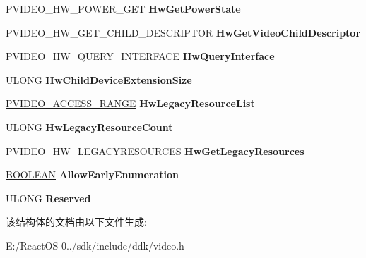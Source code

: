 \begin{DoxyCompactItemize}
P\+V\+I\+D\+E\+O\+\_\+\+H\+W\+\_\+\+P\+O\+W\+E\+R\+\_\+\+G\+ET {\bfseries Hw\+Get\+Power\+State}
\item 
\mbox{\label{struct___v_i_d_e_o___h_w___i_n_i_t_i_a_l_i_z_a_t_i_o_n___d_a_t_a_a9a52666084cdb59af0001df56b88f97a}} 
P\+V\+I\+D\+E\+O\+\_\+\+H\+W\+\_\+\+G\+E\+T\+\_\+\+C\+H\+I\+L\+D\+\_\+\+D\+E\+S\+C\+R\+I\+P\+T\+OR {\bfseries Hw\+Get\+Video\+Child\+Descriptor}
\item 
\mbox{\label{struct___v_i_d_e_o___h_w___i_n_i_t_i_a_l_i_z_a_t_i_o_n___d_a_t_a_ad88637f4f4174451acf9bacf5b3630cb}} 
P\+V\+I\+D\+E\+O\+\_\+\+H\+W\+\_\+\+Q\+U\+E\+R\+Y\+\_\+\+I\+N\+T\+E\+R\+F\+A\+CE {\bfseries Hw\+Query\+Interface}
\item 
\mbox{\label{struct___v_i_d_e_o___h_w___i_n_i_t_i_a_l_i_z_a_t_i_o_n___d_a_t_a_a017d67bcfcc83eebcc46659255d8cc68}} 
U\+L\+O\+NG {\bfseries Hw\+Child\+Device\+Extension\+Size}
\item 
\mbox{\label{struct___v_i_d_e_o___h_w___i_n_i_t_i_a_l_i_z_a_t_i_o_n___d_a_t_a_aad9148ff4d6584144a33bcbaae83ef38}} 
\hyperlink{struct___v_i_d_e_o___a_c_c_e_s_s___r_a_n_g_e}{P\+V\+I\+D\+E\+O\+\_\+\+A\+C\+C\+E\+S\+S\+\_\+\+R\+A\+N\+GE} {\bfseries Hw\+Legacy\+Resource\+List}
\item 
\mbox{\label{struct___v_i_d_e_o___h_w___i_n_i_t_i_a_l_i_z_a_t_i_o_n___d_a_t_a_a62b94e6dc0c1a17e5cdd13a48f0a1a9d}} 
U\+L\+O\+NG {\bfseries Hw\+Legacy\+Resource\+Count}
\item 
\mbox{\label{struct___v_i_d_e_o___h_w___i_n_i_t_i_a_l_i_z_a_t_i_o_n___d_a_t_a_adf21bb7ca30b7b9e2e5c9008c88fd96b}} 
P\+V\+I\+D\+E\+O\+\_\+\+H\+W\+\_\+\+L\+E\+G\+A\+C\+Y\+R\+E\+S\+O\+U\+R\+C\+ES {\bfseries Hw\+Get\+Legacy\+Resources}
\item 
\mbox{\label{struct___v_i_d_e_o___h_w___i_n_i_t_i_a_l_i_z_a_t_i_o_n___d_a_t_a_a1fd2963207fa42d982fd208c9c228044}} 
\hyperlink{_processor_bind_8h_a112e3146cb38b6ee95e64d85842e380a}{B\+O\+O\+L\+E\+AN} {\bfseries Allow\+Early\+Enumeration}
\item 
\mbox{\label{struct___v_i_d_e_o___h_w___i_n_i_t_i_a_l_i_z_a_t_i_o_n___d_a_t_a_a9172dd667c14f9f645626175bc3971e2}} 
U\+L\+O\+NG {\bfseries Reserved}
\end{DoxyCompactItemize}


该结构体的文档由以下文件生成\+:\begin{DoxyCompactItemize}
\item 
E\+:/\+React\+O\+S-\/0../sdk/include/ddk/video.\+h\end{DoxyCompactItemize}
